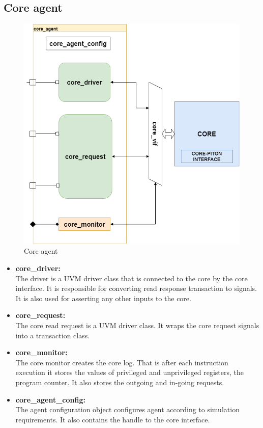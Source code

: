 \documentclass[../main.tex]{subfiles}
\begin{document}
\subsection{Core agent}
\begin{figure}[h!]
\centering
\includegraphics[scale = 0.5]{diagrams/UVM_CORE_AGENT.png}

\caption{Core agent}
\label{fig:UVM_core}
\end{figure}

\begin{itemize}
\item 	\textbf{core\_driver:}\\
The driver is a UVM driver class that is connected to the core by the core interface. It is responsible for converting read response transaction to  signals. It is also used for asserting any other inputs to the core.
\item 	\textbf{core\_request:}\\
The core read request is a UVM driver class. It wraps the core request signals into a transaction class.
\item 	\textbf{core\_monitor:}\\
The core monitor creates the core log. That is after each instruction execution it stores the values of privileged and unprivileged registers, the program counter. It also stores the outgoing and in-going requests.
\item 	\textbf{core\_agent\_config:}\\
The agent configuration object configures agent according to simulation requirements. It also contains the handle to the core interface.
\end{itemize}
\end{document}
